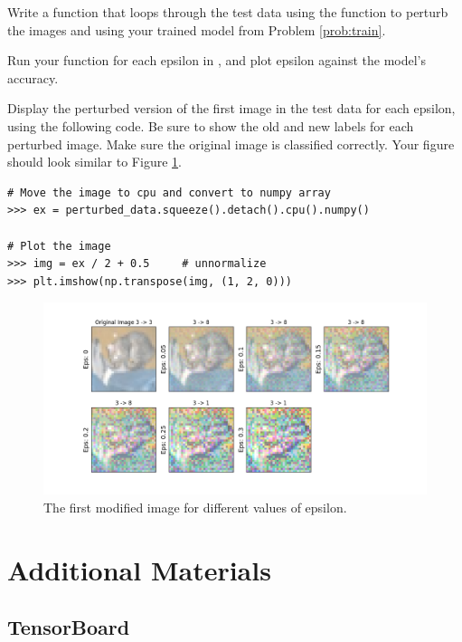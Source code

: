 \begin{problem}
Write a function that loops through the test data using the function  to perturb the images and using your trained model from Problem \ref{prob:train}.

Run your function for each epsilon in \li{[0, 0.05, 0.1, 0.15, 0.2, 0.25, 0.3]}, and plot epsilon against the model's accuracy.

Display the perturbed version of the first image in the test data for each epsilon, using the following code. Be sure to show the old and new labels for each perturbed image. Make sure the original image is classified correctly.
Your figure should look similar to Figure \ref{fig:perturbed}.

\begin{lstlisting}
# Move the image to cpu and convert to numpy array
>>> ex = perturbed_data.squeeze().detach().cpu().numpy()

# Plot the image
>>> img = ex / 2 + 0.5     # unnormalize
>>> plt.imshow(np.transpose(img, (1, 2, 0)))
\end{lstlisting}

\label{problem:adv}
\end{problem}

\begin{figure}[H]
\includegraphics[width=\textwidth]{figures/perturbed_updated.png}
\caption{The first modified image for different values of epsilon.}
\label{fig:perturbed}
\end{figure}




\newpage
\section*{Additional Materials}
\subsection*{TensorBoard}

